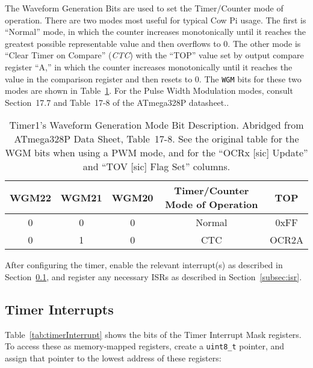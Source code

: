 The Waveform Generation Bits are used to set the Timer/Counter mode of operation.
There are two modes most useful for typical Cow Pi usage.
The first is ``Normal'' mode, in which the counter increases monotonically until it reaches the greatest possible representable value and then overflows to 0.
The other mode is ``Clear Timer on Compare'' (\textit{CTC}) with the ``TOP'' value set by output compare register ``A,'' in which the counter increases monotonically until it reaches the value in the comparison register and then resets to 0.
The \texttt{WGM} bits for these two modes are shown in Table~\ref{tab:timer2wgm}.
For the Pulse Width Modulation modes, consult Section~17.7 and Table~17\mbox{-}8 of the ATmega328P datasheet.\cite{ATmega328P}.

\begin{table}[h]
    \centering \small
    \begin{tabular}{|c|c|c|c|c|} \hline
    \textbf{WGM22}    & \textbf{WGM21}    & \textbf{WGM20}    & \textbf{Timer/Counter Mode of Operation}  & TOP    \\ \hline\hline
    0                 & 0                 & 0                 & Normal                                    & 0xFF   \\ \hline
    0                 & 1                 & 0                 & CTC                                       & OCR2A  \\ \hline
    \end{tabular}
    \caption{Timer1's Waveform Generation Mode Bit Description. \tiny Abridged from ATmega328P Data Sheet, Table~17\mbox{-}8.\cite{ATmega328P} See the original table for the WGM bits when using a PWM mode, and for the ``OCRx [sic] Update'' and ``TOV [sic] Flag Set'' columns. \label{tab:timer2wgm}}
\end{table}

After configuring the timer, enable the relevant interrupt(s) as described in Section~\ref{subsec:timerInterrupts}, and register any necessary ISRs as described in Section~\ref{subsec:isr}.


\subsection{Timer Interrupts} \label{subsec:timerInterrupts}

Table~\ref{tab:timerInterrupt} shows the bits of the Timer Interrupt Mask registers.
To access these as memory-mapped registers, create a \lstinline{uint8_t} pointer, and assign that pointer to the lowest address of these registers:

